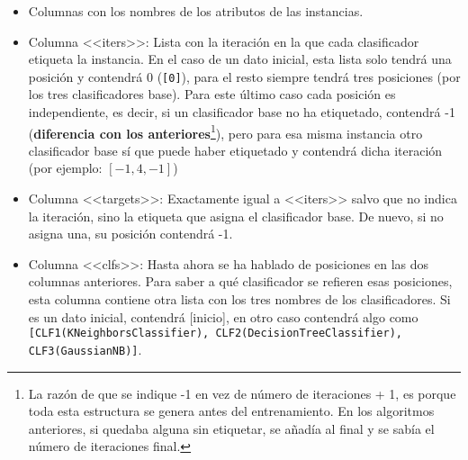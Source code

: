 \begin{itemize}
    \item Columnas con los nombres de los atributos de las instancias.
    \item Columna <<iters>>: Lista con la iteración en la que cada clasificador
    etiqueta la instancia. En el caso de un dato inicial, esta lista solo tendrá
    una posición y contendrá 0 (\texttt{[0]}), para el resto siempre tendrá tres
    posiciones (por los tres clasificadores base). Para este último caso cada
    posición es independiente, es decir, si un clasificador base no ha
    etiquetado, contendrá -1 (\textbf{diferencia con los anteriores}\footnote{La
    razón de que se indique -1 en vez de número de iteraciones + 1, es porque
    toda esta estructura se genera antes del entrenamiento. En los algoritmos
    anteriores, si quedaba alguna sin etiquetar, se añadía al final y se sabía
    el número de iteraciones final.}), pero para esa misma instancia otro
    clasificador base sí que puede haber etiquetado y contendrá dicha iteración
    (por ejemplo: $[-1,4,-1]$)
    \item Columna <<targets>>: Exactamente igual a <<iters>> salvo que no indica
    la iteración, sino la etiqueta que asigna el clasificador base. De nuevo, si
    no asigna una, su posición contendrá -1.
    \item Columna <<clfs>>: Hasta ahora se ha hablado de posiciones en las dos
    columnas anteriores. Para saber a qué clasificador se refieren esas
    posiciones, esta columna contiene otra lista con los tres nombres de los
    clasificadores. Si es un dato inicial, contendrá [inicio], en otro caso
    contendrá algo como \texttt{[CLF1(KNeighborsClassifier),
    CLF2(DecisionTreeClassifier), CLF3(GaussianNB)]}.
\end{itemize}

